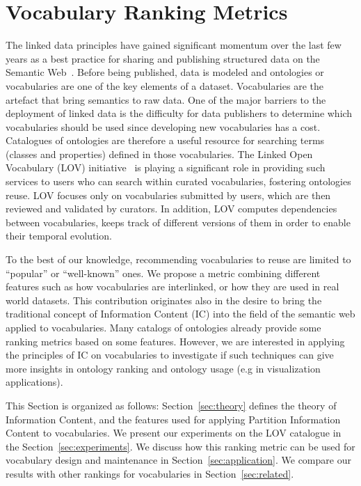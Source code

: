 \section{Vocabulary Ranking Metrics}
\label{sec:vocabranking}

\label{sec:introduction}
The linked data principles have gained significant momentum over the last few years as a best practice for sharing and publishing structured data on the Semantic Web~\cite{Bizer2009}. Before being published, data is modeled and ontologies or vocabularies are one of the key elements of a dataset. Vocabularies are the artefact that bring semantics to raw data. One of the major barriers to the deployment of linked data is the difficulty for data publishers to determine which vocabularies should be used since developing new vocabularies has a cost. Catalogues of ontologies are therefore a useful resource for searching terms (classes and properties) defined in those vocabularies. The Linked Open Vocabulary (LOV) initiative~\cite{scharffe_2012} is playing a significant role in providing such services to users who can search within curated vocabularies, fostering ontologies reuse. LOV focuses only on vocabularies submitted by users, which are then reviewed and validated by curators. In addition, LOV computes dependencies between vocabularies, keeps track of different versions of them in order to enable their temporal evolution.

To the best of our knowledge, recommending vocabularies to reuse are limited to ``popular'' or ``well-known'' ones. We propose a metric combining different features such as how vocabularies are interlinked, or how they are used in real world datasets. This contribution originates also in the desire to bring the traditional concept of Information Content (IC) into the field of the semantic web applied to vocabularies. Many catalogs of ontologies already provide some ranking metrics based on some features. However, we are interested in applying the principles of IC on vocabularies to investigate if such techniques can give more insights in ontology ranking and ontology usage (e.g in visualization applications).

This Section is organized as follows: Section~\ref{sec:theory} defines the theory of Information Content, and the features used for applying Partition Information Content to vocabularies. We present our experiments on the LOV catalogue in the Section~\ref{sec:experiments}. We discuss how this ranking metric can be used for vocabulary design and maintenance in Section~\ref{sec:application}. We compare our results with other rankings for vocabularies in Section~\ref{sec:related}.

